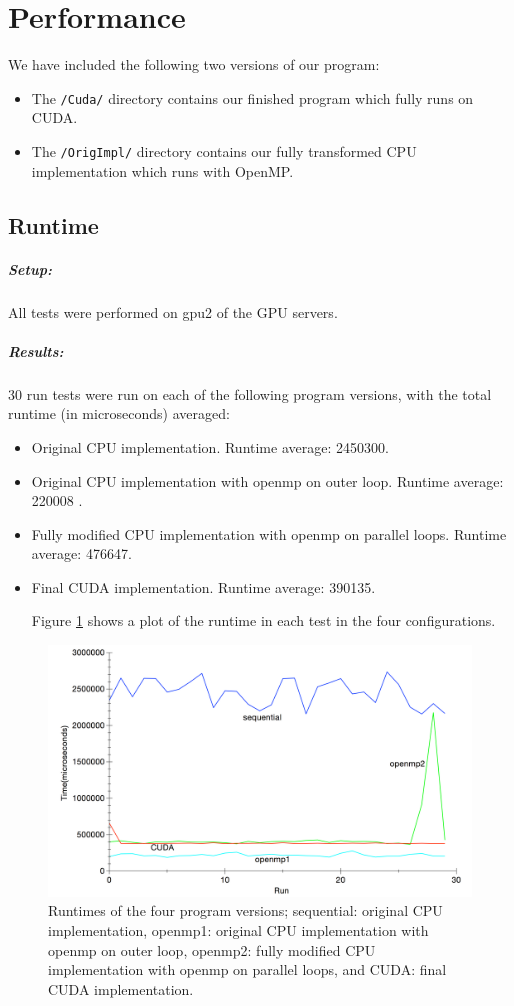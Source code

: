 \section{Performance}
We have included the following two versions of our program:
\begin{itemize}
\item The \verb!/Cuda/! directory contains our finished program which fully runs on CUDA.
\item The \verb!/OrigImpl/! directory contains our fully transformed CPU implementation which runs with OpenMP.
\end{itemize}
\subsection{Runtime}
\subparagraph{Setup:} All tests were performed on gpu2 of the GPU servers.


\subparagraph{Results:} 

30 run tests were run on each of the following program versions, with the total runtime (in microseconds) averaged:
\begin{itemize}
\item Original CPU implementation. Runtime average: 2450300.
\item Original CPU implementation with openmp on outer loop. Runtime average: 220008 .
\item Fully modified CPU implementation with openmp on parallel loops. Runtime average: 476647.
\item Final CUDA implementation. Runtime average: 390135.

Figure \ref{fig_res} shows a plot of the runtime in each test in the four configurations.
\end{itemize}
\begin{figure}[H]
\includegraphics[width=150mm]{results_plot} 
\caption{Runtimes of the four program versions; sequential: original CPU implementation, openmp1: original CPU implementation with openmp on outer loop, openmp2: fully modified CPU implementation with openmp on parallel loops, and CUDA: final CUDA implementation.}
\label{fig_res}
\end{figure}



